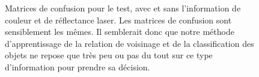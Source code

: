 \documentclass[a4paper, onecolumn, 11pt]{article}
\begin{document}
\begin{figure}[p]
    \centering
    \qquad
    \caption{Matrices de confusion pour le test, avec et sans l'information de couleur et de réflectance laser. Les matrices de confusion sont sensiblement les mêmes. Il semblerait donc que notre méthode d'apprentissage de la relation de voisinage et de la classification des objets ne repose que très peu ou pas du tout sur ce type d'information pour prendre sa décision.}
    \label{fig:laser_color}
\end{figure}
\end{document}
